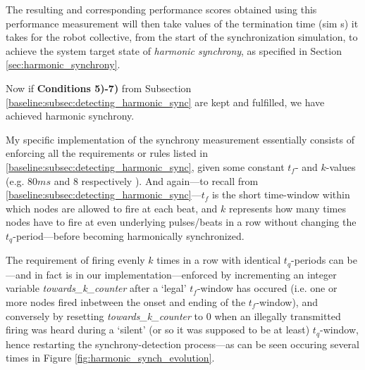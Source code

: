 	The resulting and corresponding performance scores obtained using this performance measurement will then take values of the termination time (sim s) it takes for the robot collective, from the start of the synchronization simulation, to achieve the system target state of \textit{harmonic synchrony}, as specified in Section \ref{sec:harmonic_synchrony}.

	Now if \textbf{Conditions 5)-7)} from Subsection \ref{baseline:subsec:detecting_harmonic_sync} are kept and fulfilled, we have achieved harmonic synchrony.

	My specific implementation of the synchrony measurement essentially consists of enforcing all the requirements or rules listed in \ref{baseline:subsec:detecting_harmonic_sync}, given some constant $t_f$- and $k$-values (e.g. $80ms$ and $8$ respectively \cite{nymoen_synch}). And again—to recall from \ref{baseline:subsec:detecting_harmonic_sync}—$t_f$ is the short time-window within which nodes are allowed to fire at each beat, and $k$ represents how many times nodes have to fire at even underlying pulses/beats in a row without changing the $t_q$-period—before becoming harmonically synchronized.

	The requirement of firing evenly $k$ times in a row with identical $t_q$-periods can be—and in fact is in our implementation—enforced by incrementing an integer variable \textit{towards\_k\_counter} after a `legal' $t_f$-window has occured (i.e. one or more nodes fired inbetween the onset and ending of the $t_f$-window), and conversely by resetting \textit{towards\_k\_counter} to 0 when an illegally transmitted firing was heard during a `silent' (or so it was supposed to be at least) $t_q$-window, hence restarting the synchrony-detection process—as can be seen occuring several times in Figure \ref{fig:harmonic_synch_evolution}.
	
